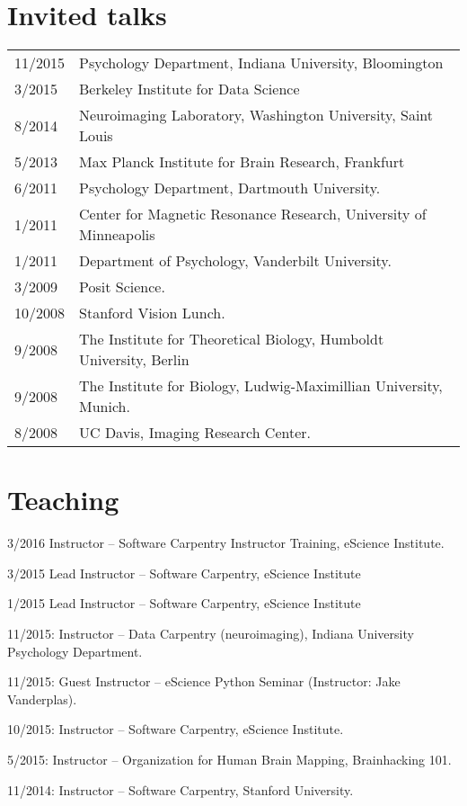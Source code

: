 \documentclass[11pt,fullpage]{article}
\begin{document}
\section*{Invited talks}
\begin{tabular}{p{0.5in}|p{5.5in}}
 11/2015 & Psychology Department, Indiana University, Bloomington \\
 3/2015 & Berkeley Institute for Data Science\\
 8/2014 & Neuroimaging Laboratory, Washington University, Saint Louis\\
 5/2013 & Max Planck Institute for Brain Research, Frankfurt\\
 6/2011 & Psychology Department, Dartmouth University.\\
 1/2011 & Center for Magnetic Resonance Research, University of Minneapolis\\
 1/2011 & Department of Psychology, Vanderbilt University.\\
 3/2009 & Posit Science.\\
 10/2008 & Stanford Vision Lunch.\\
 9/2008 & The Institute for Theoretical Biology, Humboldt University, Berlin\\
 9/2008 & The Institute for Biology, Ludwig-Maximillian University, Munich.\\
 8/2008 & UC Davis, Imaging Research Center.\\
\end{tabular}

\section*{Teaching}
3/2016 Instructor -- Software Carpentry Instructor Training, eScience Institute.

3/2015 Lead Instructor -- Software Carpentry, eScience Institute

1/2015 Lead Instructor -- Software Carpentry, eScience Institute

11/2015: Instructor -- Data Carpentry (neuroimaging), Indiana University Psychology Department.

11/2015: Guest Instructor -- eScience Python Seminar (Instructor: Jake Vanderplas).

10/2015: Instructor -- Software Carpentry, eScience Institute.

5/2015: Instructor -- Organization for Human Brain Mapping, Brainhacking 101.

11/2014: Instructor -- Software Carpentry, Stanford University.
\end{document}
